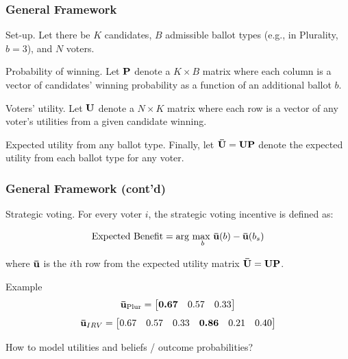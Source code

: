 \documentclass[10pt, en-GB]{beamer}
\begin{document}
\begin{frame}[t]\frametitle{General Framework}

\alert{Set-up.} Let there be $K$ candidates, $B$ admissible ballot types (e.g., in Plurality, $b = 3$), and $N$ voters.

\alert{Probability of winning.} Let $\bf P$ denote a $K \times B$ matrix where each column is a vector of candidates' winning probability as a function of an additional ballot $b$.

\alert{Voters' utility.} Let $\bf U$ denote a $N \times K$ matrix where each row is a vector of any voter's utilities from a given candidate winning.

\alert{Expected utility from any ballot type.} Finally, let $\bf \bar{U} = UP$ denote the expected utility from each ballot type for any voter.


\end{frame}

\begin{frame}[t]\frametitle{General Framework (cont'd)}

\alert{Strategic voting.} For every voter $i$, the strategic voting incentive is defined as:

\begin{equation}
	\text{Expected Benefit} = \text{arg } \underset{b}{\text{max }} {\bf \bar{u}}(b) - {\bf \bar{u}}(b_s)
\end{equation}

where $\bf \bar{u}$ is the $i$th row from the expected utility matrix $\bf \bar{U} = UP$.

\pause
\begin{block}{Example}
\begin{equation*}
	{\bf \bar{u}}_{\text{Plur}} = \begin{bmatrix}
	\textbf{0.67} & 0.57 & 0.33
	\end{bmatrix}
\end{equation*}
\begin{equation*}
	{\bf \bar{u}}_{{IRV}} = \begin{bmatrix}
	0.67 & 0.57 & 0.33 & \textbf{0.86} & 0.21 & 0.40
	\end{bmatrix}
\end{equation*}
\end{block}

\pause
How to model utilities and beliefs / outcome probabilities?

\end{frame}
\end{document}
